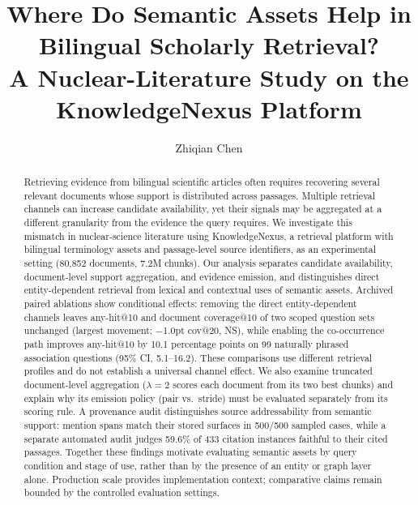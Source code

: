 \documentclass[sigconf,nonacm]{acmart}
\begin{document}
\title{Where Do Semantic Assets Help in Bilingual Scholarly Retrieval?%
\\A Nuclear-Literature Study on the KnowledgeNexus Platform}
\author{Zhiqian Chen}

\begin{abstract}
Retrieving evidence from bilingual scientific articles often requires
recovering several relevant documents whose support is distributed
across passages. Multiple retrieval channels can increase candidate
availability, yet their signals may be aggregated at a different
granularity from the evidence the query requires. We investigate this
mismatch in nuclear-science literature using KnowledgeNexus, a
retrieval platform with bilingual terminology assets and
passage-level source identifiers, as an experimental setting
(80{,}852 documents, 7.2M chunks). Our analysis separates candidate
availability, document-level support aggregation, and evidence
emission, and distinguishes direct entity-dependent retrieval from
lexical and contextual uses of semantic assets. Archived paired
ablations show conditional effects: removing the direct
entity-dependent channels leaves any-hit@10 and document
coverage@10 of two scoped question sets unchanged (largest movement: $-$1.0pt cov@20, NS), while
enabling the co-occurrence path improves any-hit@10 by 10.1 percentage
points on 99 naturally phrased association questions (95\% CI,
5.1--16.2). These comparisons use different retrieval profiles and do
not establish a universal channel effect. We also examine truncated
document-level aggregation ($\lambda{=}2$ scores each document from its
two best chunks) and explain why its emission policy (pair vs.\ stride)
must be evaluated separately from its scoring rule. A provenance audit
distinguishes source addressability from semantic support: mention
spans match their stored surfaces in 500/500 sampled cases, while a
separate automated audit judges 59.6\% of 433 citation instances
faithful to their cited passages. Together these findings motivate
evaluating semantic assets by query condition and stage of use, rather
than by the presence of an entity or graph layer alone. Production
scale provides implementation context; comparative claims remain
bounded by the controlled evaluation settings.
\end{abstract}
\maketitle
\end{document}
